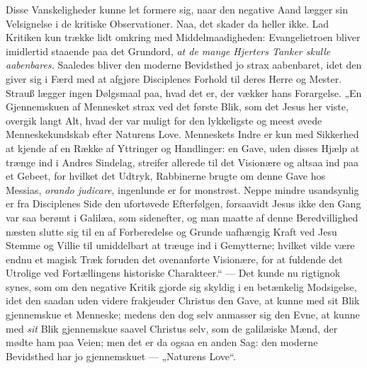 \documentclass[12pt,a4paper]{book}
\begin{document}
Disse Vanskeligheder kunne let formere sig, naar den negative Aand lægger sin
Velsignelse i de kritiske Observationer. Naa, det skader da heller ikke. Lad
Kritiken kun trække lidt omkring med Middelmaadigheden: Evangelietroen bliver
imidlertid staaende paa det Grundord, \emph{at de mange Hjerters Tanker skulle
aabenbares.} Saaledes bliver den moderne Bevidsthed jo strax aabenbaret, idet den
giver sig i Færd med at afgjøre Disciplenes Forhold til deres Herre og Mester.
Strauß lægger ingen Dølgsmaal paa, hvad det er, der vækker hans Forargelse. „En
Gjennemskuen af Mennesket strax ved det første Blik, som det Jesus her viste,
overgik langt Alt, hvad der var muligt for den lykkeligste og meest
øvede Menneskekundskab efter Naturens Love. Menneskets Indre er kun med
Sikkerhed at kjende af en Række af Yttringer og Handlinger: en Gave, uden disses
Hjælp at trænge ind i Andres Sindelag, streifer allerede til det Visionære og
altsaa ind paa et Gebeet, for hvilket det Udtryk, Rabbinerne brugte om denne
Gave hos Messias, \textit{orando judicare}, ingenlunde er for monstrøst. Neppe
mindre usandsynlig er fra Disciplenes Side den ufortøvede Efterfølgen,
forsaavidt Jesus ikke den Gang var saa berømt i Galilæa, som sidenefter, og man
maatte af denne Beredvillighed næsten slutte sig til en af Forberedelse og
Grunde uafhængig Kraft ved Jesu Stemme og Villie til umiddelbart at træuge ind i
Gemytterne; hvilket vilde være endnu et magisk Træk foruden det ovenanførte
Visionære, for at fuldende det Utrolige ved Fortællingens historiske
Charakteer.“ --- Det kunde nu rigtignok synes, som om den negative Kritik gjorde
sig skyldig i en betænkelig Modsigelse, idet den saadan uden videre frakjeuder
Christus den Gave, at kunne med sit Blik gjennemskue et Menneske; medens den dog
selv anmasser sig den Evne, at kunne med \emph{sit} Blik gjennemskue saavel
Christus selv, som de galilæiske Mænd, der mødte ham paa Veien; men det er da
ogsaa en anden Sag: den moderne Bevidsthed har jo gjennemskuet --- „Naturens
Love“.
\end{document}
